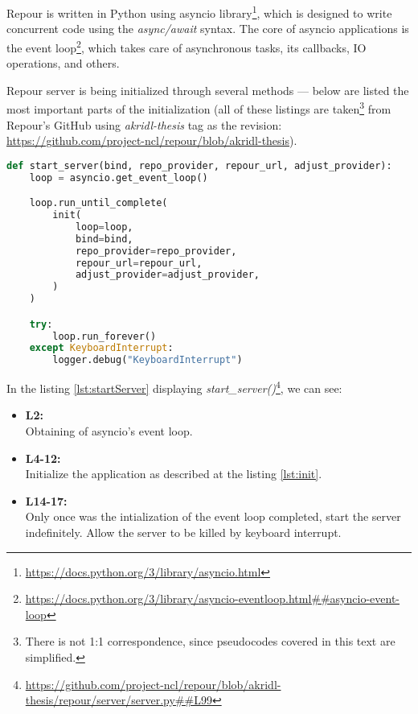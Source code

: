 \documentclass[../main.tex]{subfiles}
\begin{document}
Repour is written in Python using asyncio library\footnote{\url{https://docs.python.org/3/library/asyncio.html}}, which is designed to write concurrent code using the \textit{async/await} syntax. The core of asyncio applications is the event loop\footnote{\url{https://docs.python.org/3/library/asyncio-eventloop.html##asyncio-event-loop}}, which takes care of asynchronous tasks, its callbacks, IO operations, and others.

Repour server is being initialized through several methods — below are listed the most important parts of the initialization (all of these listings are taken\footnote{There is not 1:1 correspondence, since pseudocodes covered in this text are simplified.} from Repour's GitHub using \textit{akridl-thesis} tag as the revision: \url{https://github.com/project-ncl/repour/blob/akridl-thesis}).

\begin{lstlisting}[language=Python, caption=Server initialization: \textit{start\_server} method, label={lst:startServer}]
def start_server(bind, repo_provider, repour_url, adjust_provider):
    loop = asyncio.get_event_loop()

    loop.run_until_complete(
        init(
            loop=loop,
            bind=bind,
            repo_provider=repo_provider,
            repour_url=repour_url,
            adjust_provider=adjust_provider,
        )
    )

    try:
        loop.run_forever()
    except KeyboardInterrupt:
        logger.debug("KeyboardInterrupt")
\end{lstlisting}

In the listing \ref{lst:startServer} displaying \textit{start\_server()}\footnote{\url{https://github.com/project-ncl/repour/blob/akridl-thesis/repour/server/server.py##L99}}, we can see:
\begin{itemize}
    \item \textbf{L2:}\\
    Obtaining of asyncio's event loop.

    \item \textbf{L4-12:}\\
    Initialize the application as described at the listing \ref{lst:init}.

    \item \textbf{L14-17:}\\
    Only once was the intialization of the event loop completed, start the server indefinitely. Allow the server to be killed by keyboard interrupt.
\end{itemize}
\end{document}
